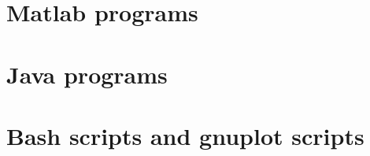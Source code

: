 \documentclass[12pt,a4paper]{report}
\begin{document}







	









\nocite{*}

 	

\begin{appendices}
\chapter{Matlab programs}
\label{App:AppendixA}

\chapter{Java programs} 

\label{App:AppendixB}

\chapter{Bash scripts and gnuplot scripts}
\label{App:AppendixC}

\end{appendices}
\end{document}
